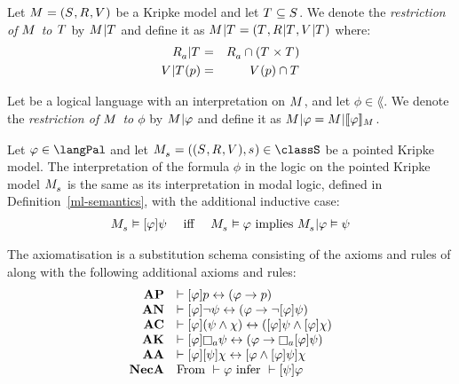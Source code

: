 \begin{definition}
Let $\kModelAndTuple$ be a Kripke model and let $\kStatesT \subseteq \kStates$.
We denote the {\em restriction of $\kModel$ to $\kStatesT$} by $\restrict{\kModel}{\kStatesT}$ and
define it as $\restrict{\kModel}{\kStatesT} = (\kStatesT, \restrict{\kAccessibilityRel}{\kStatesT}, \restrict{\kValuation}{\kStatesT})$ where:
\begin{eqnarray*}
    \restrict{\kAccessibilityA}{\kStatesT} &=& \kAccessibilityA \cap (\kStatesT \times \kStatesT)\\
    \restrict{\kValuation}{\kStatesT}(\atomP) &=& \kValuation(\atomP) \cap \kStatesT
\end{eqnarray*}

Let \lang{} be a logical language with an interpretation on $\kModel$, and let $\phi \in \lang$.
We denote the {\em restriction of $\kModel$ to $\phi$} by $\restrict{\kModel}{\phi}$ and define it as $\restrict{\kModel}{\phi} = \restrict{\kModel}{\interpretation[\kModel]{\phi}}$.
\end{definition}

\begin{definition}\label{pal-semantics}
Let $\phi \in \langPal$ and let $\kPModelAndTuple{\kStateS} \in \classS$ be a pointed Kripke model.
The interpretation of the formula $\phi$ in the logic \logicPalS{} on the pointed Kripke model $\kPModel{\kStateS}$ is the same as its interpretation in modal logic, defined in Definition~\ref{ml-semantics}, with the additional inductive case:
$$
\begin{array}{lcl}
\kPModel{\kStateS} \entails \announceA{\phi} \psi & \text{ iff } & \kPModel{\kStateS} \entails \phi \text{ implies } \restrict{\kPModel{\kStateS}}{\phi} \entails \psi
\end{array}
$$
\end{definition}

\begin{definition}
The axiomatisation \axiomPalS{} is a substitution schema consisting of the axioms and rules of \axiomS{} along with the following additional axioms and rules:
$$
\begin{array}{rl}
    {\bf AP} & \proves \announceA{\phi} \atomP \iff (\phi \implies \atomP)\\
    {\bf AN} & \proves \announceA{\phi} \lnot \psi \iff (\phi \implies \lnot \announceA{\phi} \psi)\\
    {\bf AC} & \proves \announceA{\phi} (\psi \land \chi) \iff (\announceA{\phi} \psi \land \announceA{\phi} \chi)\\
    {\bf AK} & \proves \announceA{\phi} \necessaryA \psi \iff (\phi \implies \necessaryA \announceA{\phi} \psi)\\
    {\bf AA} & \proves \announceA{\phi} \announceA{\psi} \chi \iff \announceA{\phi \land \announceA{\phi} \psi} \chi\\
    {\bf NecA} & \text{From } \proves \phi \text{ infer } \proves \announceA{\psi} \phi
\end{array}
$$
\end{definition}

